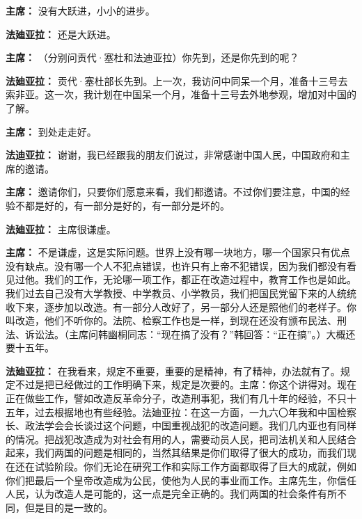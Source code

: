 \begin{list}{}
\item[\textbf{主席：}] 没有大跃进，小小的进步。

\item[\textbf{法廸亚拉：}] 还是大跃进。

\item[\textbf{主席：}] （分别问贡代·塞杜和法迪亚拉）你先到，还是你先到的呢？

\item[\textbf{法廸亚拉：}] 贡代·塞杜部长先到。上一次，我访问中同呆一个月，准备十三号去索非亚。这一次，我计划在中国呆一个月，准备十三号去外地参观，增加对中国的了解。

\item[\textbf{主席：}] 到处走走好。

\item[\textbf{法迪亚拉：}] 谢谢，我已经跟我的朋友们说过，非常感谢中国人民，中国政府和主席的邀请。

\item[\textbf{主席：}] 邀请你们，只要你们愿意来看，我们都邀请。不过你们要注意，中国的经验不都是好的，有一部分是好的，有一部分是坏的。

\item[\textbf{法廸亚拉：}] 主席很谦虚。

\item[\textbf{主席：}] 不是谦虚，这是实际问题。世界上没有哪一块地方，哪一个国家只有优点没有缺点。没有哪一个人不犯点错误，也许只有上帝不犯错误，因为我们都没有看见过他。我们的工作，无论哪一项工作，都正在改造过程中，教育工作也是如此。我们过去自己没有大学教授、中学教员、小学教员，我们把国民党留下来的人统统收下来，逐步加以改造。有一部分人改好了，另一部分人还是照他们的老样子。你叫改造，他们不听你的。法院、检察工作也是一样，到现在还没有颁布民法、刑法、诉讼法。（主席问韩幽桐同志：“现在搞了没有？”韩回答：“正在搞”。）大概还要十五年。

\item[\textbf{法廸亚拉：}] 在我看来，规定不重要，重要的是精神，有了精神，办法就有了。规定不过是把已经做过的工作明确下来，规定是次要的。主席：你这个讲得对。现在正在做些工作，譬如改造反革命分子，改造刑事犯，我们有几十年的经验，不只十五年，过去根据地也有些经验。法廸亚拉：在这一方面，一九六〇年我和中国检察长、政法学会会长谈过这个问题，中国重视战犯的改造问题。我们几内亚也有同样的情况。把战犯改造成为对社会有用的人，需要动员人民，把司法机关和人民结合起来，我们两国的问题是相同的，当然其结果是你们取得了很大的成功，而我们现在还在试验阶段。你们无论在研究工作和实际工作方面都取得了巨大的成就，例如你们把最后一个皇帝改造成为公民，使他为人民的事业而工作。主席先生，你信任人民，认为改造人是可能的，这一点是完全正确的。我们两国的社会条件有所不同，但是目的是一致的。


\end{list}
